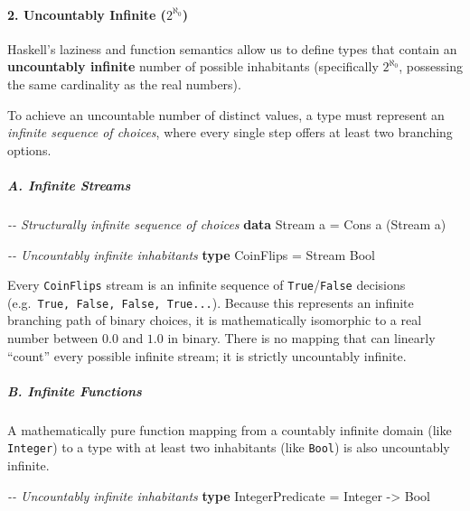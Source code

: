 \documentclass[
]{article}
\newenvironment{Shaded}{}{}
\newcommand{\CommentTok}[1]{\textcolor[rgb]{0.38,0.63,0.69}{\textit{#1}}}
\newcommand{\DataTypeTok}[1]{\textcolor[rgb]{0.56,0.13,0.00}{#1}}
\newcommand{\KeywordTok}[1]{\textcolor[rgb]{0.00,0.44,0.13}{\textbf{#1}}}
\newcommand{\NormalTok}[1]{#1}
\newcommand{\OtherTok}[1]{\textcolor[rgb]{0.00,0.44,0.13}{#1}}
\begin{document}
\paragraph{\texorpdfstring{2. Uncountably Infinite
(\(2^{\aleph_0}\))}{2. Uncountably Infinite (2\^{}\{\textbackslash aleph\_0\})}}\label{uncountably-infinite-2aleph_0}

Haskell's laziness and function semantics allow us to define types that
contain an \textbf{uncountably infinite} number of possible inhabitants
(specifically \(2^{\aleph_0}\), possessing the same cardinality as the
real numbers).

To achieve an uncountable number of distinct values, a type must
represent an \emph{infinite sequence of choices}, where every single
step offers at least two branching options.

\subparagraph{A. Infinite Streams}\label{a.-infinite-streams}

\begin{Shaded}
\begin{Highlighting}[]
\CommentTok{{-}{-} Structurally infinite sequence of choices}
\KeywordTok{data} \DataTypeTok{Stream}\NormalTok{ a }\OtherTok{=} \DataTypeTok{Cons}\NormalTok{ a (}\DataTypeTok{Stream}\NormalTok{ a)}

\CommentTok{{-}{-} Uncountably infinite inhabitants}
\KeywordTok{type} \DataTypeTok{CoinFlips} \OtherTok{=} \DataTypeTok{Stream} \DataTypeTok{Bool}
\end{Highlighting}
\end{Shaded}

Every \texttt{CoinFlips} stream is an infinite sequence of
\texttt{True}/\texttt{False} decisions
(e.g.~\texttt{True,\ False,\ False,\ True...}). Because this represents
an infinite branching path of binary choices, it is mathematically
isomorphic to a real number between \(0.0\) and \(1.0\) in binary. There
is no mapping that can linearly ``count'' every possible infinite
stream; it is strictly uncountably infinite.

\subparagraph{B. Infinite Functions}\label{b.-infinite-functions}

A mathematically pure function mapping from a countably infinite domain
(like \texttt{Integer}) to a type with at least two inhabitants (like
\texttt{Bool}) is also uncountably infinite.

\begin{Shaded}
\begin{Highlighting}[]
\CommentTok{{-}{-} Uncountably infinite inhabitants}
\KeywordTok{type} \DataTypeTok{IntegerPredicate} \OtherTok{=} \DataTypeTok{Integer} \OtherTok{{-}\textgreater{}} \DataTypeTok{Bool}
\end{Highlighting}
\end{Shaded}
\end{document}
